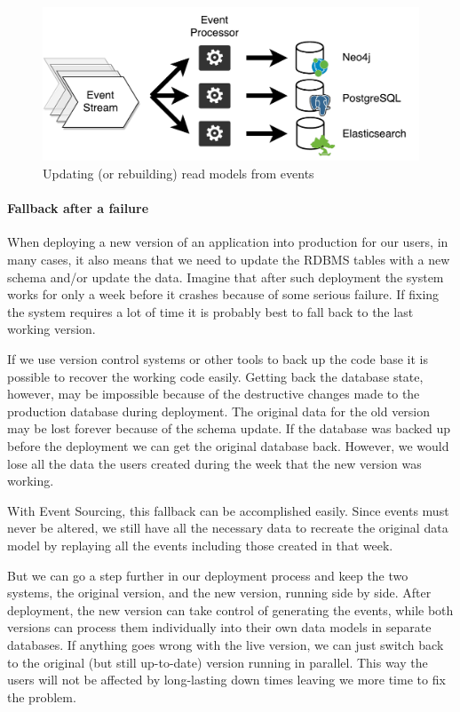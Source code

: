 \documentclass{book}
\begin{document}
\begin{figure}[h!]
\begin{center}
\includegraphics[width=0.84\columnwidth]{figures/projections/projections}
\caption{Updating (or rebuilding) read models from events%
}
\end{center}
\end{figure}

\paragraph{Fallback after a failure}\label{fallback-after-a-failure}

When deploying a new version of an application into production for our
users, in many cases, it also means that we need to update the RDBMS
tables with a new schema and/or update the data. Imagine that after such
deployment the system works for only a week before it crashes because of
some serious failure. If fixing the system requires a lot of time it is
probably best to fall back to the last working version.

If we use version control systems or other tools to back up the code
base it is possible to recover the working code easily. Getting back the
database state, however, may be impossible because of the destructive
changes made to the production database during deployment. The original
data for the old version may be lost forever because of the schema
update. If the database was backed up before the deployment we can get
the original database back. However, we would lose all the data the
users created during the week that the new version was working.

With Event Sourcing, this fallback can be accomplished easily. Since
events must never be altered, we still have all the necessary data to
recreate the original data model by replaying all the events including
those created in that week.

But we can go a step further in our deployment process and keep the two
systems, the original version, and the new version, running side by
side. After deployment, the new version can take control of generating
the events, while both versions can process them individually into their
own data models in separate databases. If anything goes wrong with the
live version, we can just switch back to the original (but still
up-to-date) version running in parallel. This way the users will not be
affected by long-lasting down times leaving we more time to fix the
problem.
\end{document}
